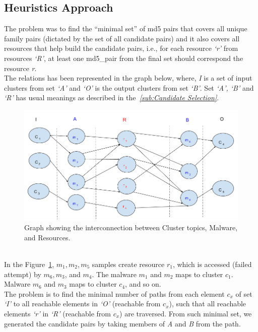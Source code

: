 \subsection{Heuristics Approach}
\label{sub:Heuristics Approach}
The problem was to find the ``minimal set'' of md5 pairs that covers all unique family pairs (dictated by the set of all candidate pairs) and it also covers all resources that help build the candidate pairs, i.e., for each resource \emph{`r'} from resources \emph{`R'}, at least one md5\_pair from the final set should correspond the resource \emph{r}.\\
The relations has been represented in the graph below, where, \emph{I} is a set of input clusters from set \emph{`A'} and \emph{`O'} is the output clusters from set \emph{`B'}. Set \emph{`A', `B'} and \emph{`R'} has usual meanings as described in the\textit{~\autoref{sub:Candidate Selection}}.
\begin{figure}[htbp]
  \centering
  \includegraphics[scale=0.45]{figures/dhkheuristics.png}
  \caption[]{Graph showing the interconnection between Cluster topics, Malware, and Resources.}\label{fig:dhkheuristics}
\end{figure}
\\
In the Figure~\ref{fig:dhkheuristics},  $m_1,m_2, m_5$ samples create resource $r_1$, which is accessed (failed attempt) by $m_6, m_3$, and $m_4$.
The malware $m_1$ and $m_2$ maps to cluster $c_1$. Malware $m_6$ and $m_3$ maps to cluster $c_4$, and so on.
\\
The problem is to find the minimal number of paths from each element \emph{$c_x$} of set \emph{`I'} to all reachable elements in \emph{`O'} (reachable from \emph{$c_x$}), such that all reachable elements \emph{`r'} in \emph{`R'} (reachable from \emph{$c_x$}) are traversed. From such minimal set, we generated the candidate pairs by taking members of \emph{A} and \emph{B} from the path.
